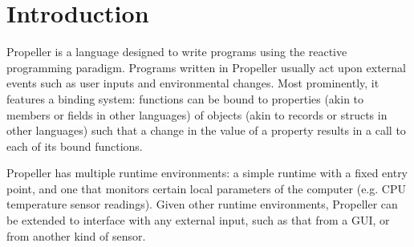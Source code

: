 \section{Introduction}

Propeller is a language designed to write programs using the reactive programming paradigm. Programs
written in Propeller usually act upon external events such as user inputs and environmental changes.
Most prominently, it features a binding system: functions can be bound to properties (akin to members
or fields in other languages) of objects (akin to records or structs in other languages) such that a
change in the value of a property results in a call to each of its bound functions.

Propeller has multiple runtime environments: a simple runtime with a fixed entry point, and one that
monitors certain local parameters of the computer (e.g. CPU temperature sensor readings). Given other
runtime environments, Propeller can be extended to interface with any external input, such as
that from a GUI, or from another kind of sensor.
